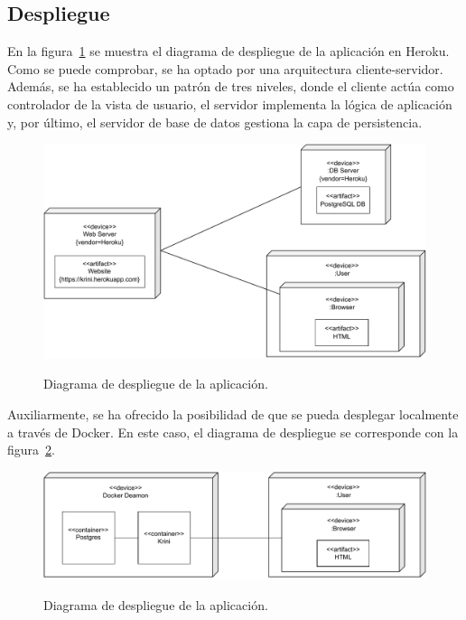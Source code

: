 \subsection{Despliegue}

En la figura~\ref{c:diagrama-deploy-heroku} se muestra el diagrama de despliegue de la aplicación en Heroku. Como se puede comprobar, se ha optado por una arquitectura cliente-servidor. Además, se ha establecido un patrón de tres niveles, donde el cliente actúa como controlador de la vista de usuario, el servidor implementa la lógica de aplicación y, por último, el servidor de base de datos gestiona la capa de persistencia.

\begin{figure}[h]
	\caption[Diagrama: despliegue]{Diagrama de despliegue de la aplicación.}
	\centering
	\includegraphics[width=\textwidth]{../img/anexos/diagrams/deploy-heroku}
	\label{c:diagrama-deploy-heroku}
\end{figure}


Auxiliarmente, se ha ofrecido la posibilidad de que se pueda desplegar localmente a través de Docker. En este caso, el diagrama de despliegue se corresponde con la figura~\ref{c:diagrama-deploy-docker}.

\begin{figure}[h]
	\caption[Diagrama: despliegue]{Diagrama de despliegue de la aplicación.}
	\centering
	\includegraphics[width=\textwidth]{../img/anexos/diagrams/deploy-docker}
	\label{c:diagrama-deploy-docker}
\end{figure}
